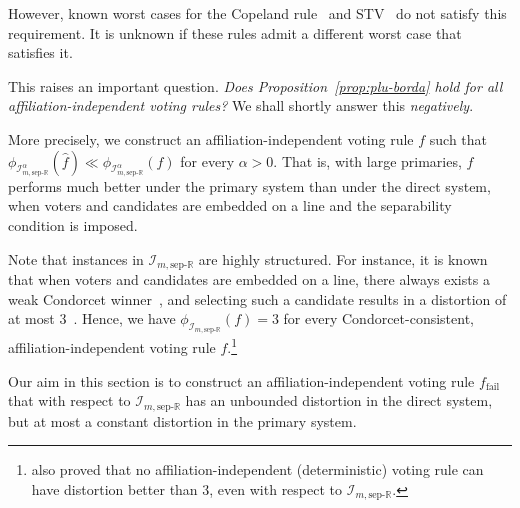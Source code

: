 \documentclass[letterpaper]{article} %
\theoremstyle{definition}
\renewcommand{\hat}{\widehat}
\newcommand{\bbR}{\mathbb{R}}
\newcommand{\calI}{\mathcal{I}}
\newcommand{\sep}{\textrm{sep-}}
\newcommand{\eucline}{\bbR}
\newcommand{\euclinesep}{\sep\eucline}
\newcommand{\I}{\calI}
\newcommand{\fail}{{\textrm{fail}}}
\begin{document}
However, known worst cases for the Copeland rule~\cite{ABP15} and STV~\cite{SE17} do not satisfy this requirement. It is unknown if these rules admit a different worst case that satisfies it.

This raises an important question. \emph{Does Proposition~\ref{prop:plu-borda} hold for all affiliation-independent voting rules?} We shall shortly answer this \emph{negatively}.

More precisely, we construct an affiliation-independent voting rule $f$ such that $\phi_{\I^{\alpha}_{m,\euclinesep}}(\hat{f}) \ll \phi_{\I^{\alpha}_{m,\euclinesep}}(f)$ for every $\alpha > 0$. That is, with large primaries, $f$ performs much better under the primary system than under the direct system, when voters and candidates are embedded on a line and the separability condition is imposed.

Note that instances in $\I_{m,\euclinesep}$ are highly structured. For instance, it is known that when voters and candidates are embedded on a line, there always exists a weak Condorcet winner~\cite{Bla48}, and selecting such a candidate results in a distortion of at most $3$~\cite{ABP15}. Hence, we have $\phi_{\I_{m,\euclinesep}}(f) = 3$ for every Condorcet-consistent, affiliation-independent voting rule $f$.\footnote{\cite{ABP15} also proved that no affiliation-independent (deterministic) voting rule can have distortion better than $3$, even with respect to $\I_{m,\euclinesep}$.}

Our aim in this section is to construct an affiliation-independent voting rule $f_\fail$ that with respect to $\I_{m,\euclinesep}$ has an unbounded distortion in the direct system, but at most a constant distortion in the primary system.%
\end{document}
